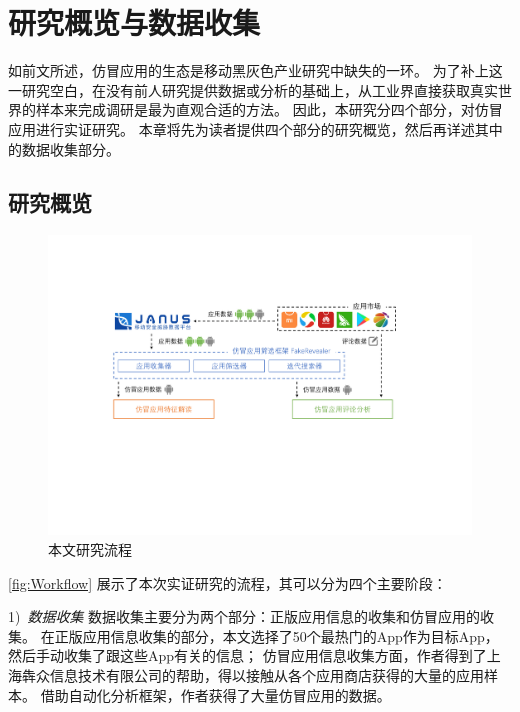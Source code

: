 \chapter{研究概览与数据收集}
\label{chp:dataCollection}

如前文所述，仿冒应用的生态是移动黑灰色产业研究中缺失的一环。
为了补上这一研究空白，在没有前人研究提供数据或分析的基础上，从工业界直接获取真实世界的样本来完成调研是最为直观合适的方法。
因此，本研究分四个部分，对仿冒应用进行实证研究。
本章将先为读者提供四个部分的研究概览，然后再详述其中的数据收集部分。

\section{研究概览}

\begin{figure}[htbp]
	\centering
	\includegraphics[width=\textwidth]{./Figures/edwin-overview}
	\caption{本文研究流程}
	\label{fig:Workflow}
	\vspace{-3mm}
\end{figure}

\autoref{fig:Workflow} 展示了本次实证研究的流程，其可以分为四个主要阶段：

1)\ \emph{数据收集} \quad
数据收集主要分为两个部分：正版应用信息的收集和仿冒应用的收集。
在正版应用信息收集的部分，本文选择了50个最热门的App作为目标App，然后手动收集了跟这些App有关的信息；
仿冒应用信息收集方面，作者得到了上海犇众信息技术有限公司的帮助，得以接触从各个应用商店获得的大量的应用样本。
借助自动化分析框架\mytool，作者获得了大量仿冒应用的数据。

